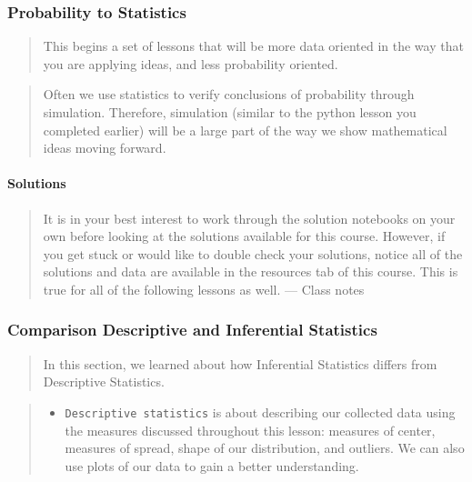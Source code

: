 \documentclass[]{book}
\providecommand{\tightlist}{%
  \setlength{\itemsep}{0pt}\setlength{\parskip}{0pt}}
\let\oldparagraph\paragraph
\renewcommand{\paragraph}[1]{\oldparagraph{#1}\mbox{}}
\begin{document}
\subsubsection{Probability to
Statistics}\label{probability-to-statistics}

\begin{quote}
This begins a set of lessons that will be more data oriented in the way
that you are applying ideas, and less probability oriented.
\end{quote}

\begin{quote}
Often we use statistics to verify conclusions of probability through
simulation. Therefore, simulation (similar to the python lesson you
completed earlier) will be a large part of the way we show mathematical
ideas moving forward.
\end{quote}

\paragraph{Solutions}\label{solutions}

\begin{quote}
It is in your best interest to work through the solution notebooks on
your own before looking at the solutions available for this course.
However, if you get stuck or would like to double check your solutions,
notice all of the solutions and data are available in the resources tab
of this course. This is true for all of the following lessons as well.
--- Class notes
\end{quote}

\subsubsection{Comparison Descriptive and Inferential
Statistics}\label{comparison-descriptive-and-inferential-statistics}

\begin{quote}
In this section, we learned about how Inferential Statistics differs
from Descriptive Statistics.
\end{quote}

\begin{quote}
\begin{itemize}
\tightlist
\item
  \texttt{Descriptive\ statistics} is about describing our collected
  data using the measures discussed throughout this lesson: measures of
  center, measures of spread, shape of our distribution, and outliers.
  We can also use plots of our data to gain a better understanding.
\end{itemize}
\end{quote}
\end{document}
